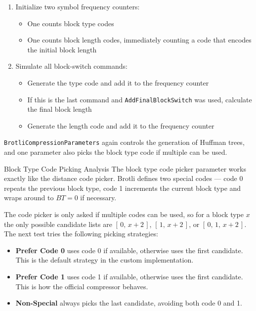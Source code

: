 \documentclass[english,master,dept460,male,cpp,cpdeclaration]{diploma}
\makeatletter
\renewcommand\paragraph
	{\@startsection{paragraph}{4}{\z@}
	{-3.25ex plus 1ex minus .2ex}
	{1.5ex plus .2ex}
	{\normalfont\normalsize\bfseries}}
\newcommand{\subfoursection}[1]{\paragraph{#1}}
\newcommand{\nosep}{\itemsep0em}
\makeatother
\begin{document}
		\begin{enumerate} \nosep
			\item Initialize two symbol frequency counters:
				\begin{itemize} \nosep
					\item One counts block type codes
					\item One counts block length codes, immediately counting a code that encodes the initial block length
				\end{itemize}
			\item Simulate all block-switch commands:
				\begin{itemize} \nosep
					\item Generate the type code and add it to the frequency counter
					\item If this is the last command and \verb|AddFinalBlockSwitch| was used, calculate the final block length
					\item Generate the length code and add it to the frequency counter
				\end{itemize}
		\end{enumerate}
		
		\noindent
		\verb|BrotliCompressionParameters| again controls the generation of Huffman trees, and one parameter also picks the block type code if multiple can be used.
		
			\subfoursection{Block Type Code Picking Analysis}
			The block type code picker parameter works exactly like the distance code picker. Brotli defines two special codes --- code 0 repeats the previous block type, code 1 increments the current block type and wraps around to $BT = 0$ if necessary.
			
			The code picker is only asked if multiple codes can be used, so for a block type $x$ the only possible candidate lists are $[\,0,\,x + 2\,]$, $[\,1,\,x + 2\,]$, or $[\,0,\,1,\,x + 2\,]$. The next test tries the following picking strategies:
			
			\begin{itemize} \nosep
				\item \textbf{Prefer Code 0} uses code 0 if available, otherwise uses the first candidate. This is the default strategy in the custom implementation.
				\item \textbf{Prefer Code 1} uses code 1 if available, otherwise uses the first candidate. This is how the official compressor behaves.
				\item \textbf{Non-Special} always picks the last candidate, avoiding both code 0 and 1.
			\end{itemize}
		
\end{document}
